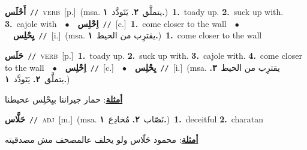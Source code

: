 \documentclass[10pt,a4paper,twoside]{article} %
\begin{document}
\begin{multicols}{2}
{\setlength\topsep{0pt}\textbf{\foreignlanguage{arabic}{أَحْلَس}}\ {\color{gray}\texttt{//}\color{black}}\ \textsc{verb}\ [p.]\ \color{gray}(msa. \foreignlanguage{arabic}{يتملَّق}~\foreignlanguage{arabic}{\textbf{٢.}}  \foreignlanguage{arabic}{يَتَودَّد}~\foreignlanguage{arabic}{\textbf{١.}})\color{black}\ \textbf{1.}~toady up.  \textbf{2.}~suck up with.  \textbf{3.}~cajole with\ \ $\bullet$\ \ \setlength\topsep{0pt}\textbf{\foreignlanguage{arabic}{اِحْلِس}}\ {\color{gray}\texttt{//}\color{black}}\ [c.]\ \textbf{1.}~come closer to the wall\ \ $\bullet$\ \ \setlength\topsep{0pt}\textbf{\foreignlanguage{arabic}{يِحْلِس}}\ {\color{gray}\texttt{//}\color{black}}\ [i.]\ \color{gray}(msa. \foreignlanguage{arabic}{يقترِب من الحيط}~\foreignlanguage{arabic}{\textbf{١.}})\color{black}\ \textbf{1.}~come closer to the wall\ } \vspace{2mm}

{\setlength\topsep{0pt}\textbf{\foreignlanguage{arabic}{حَلَس}}\ {\color{gray}\texttt{//}\color{black}}\ \textsc{verb}\ [p.]\ \textbf{1.}~toady up.  \textbf{2.}~suck up with.  \textbf{3.}~cajole with.  \textbf{4.}~come closer to the wall\ \ $\bullet$\ \ \setlength\topsep{0pt}\textbf{\foreignlanguage{arabic}{اِحْلِس}}\ {\color{gray}\texttt{//}\color{black}}\ [c.]\ \ $\bullet$\ \ \setlength\topsep{0pt}\textbf{\foreignlanguage{arabic}{يِحْلِس}}\ {\color{gray}\texttt{//}\color{black}}\ [i.]\ \color{gray}(msa. \foreignlanguage{arabic}{يقترِب من الحيط}~\foreignlanguage{arabic}{\textbf{٣.}}  \foreignlanguage{arabic}{يتملَّق}~\foreignlanguage{arabic}{\textbf{٢.}}  \foreignlanguage{arabic}{يَتَودَّد}~\foreignlanguage{arabic}{\textbf{١.}})\color{black}\  \begin{flushright}\color{gray}\foreignlanguage{arabic}{\textbf{\underline{\foreignlanguage{arabic}{أمثلة}}}: حمار جيراننا بيِحْلِس عحيطنا}\end{flushright}\color{black}} \vspace{2mm}

{\setlength\topsep{0pt}\textbf{\foreignlanguage{arabic}{حَلَّاس}}\ {\color{gray}\texttt{//}\color{black}}\ \textsc{adj}\ [m.]\ \color{gray}(msa. \foreignlanguage{arabic}{نَصّاب}~\foreignlanguage{arabic}{\textbf{٢.}}  \foreignlanguage{arabic}{مُخادِع}~\foreignlanguage{arabic}{\textbf{١.}})\color{black}\ \textbf{1.}~deceitful  \textbf{2.}~charatan\  \begin{flushright}\color{gray}\foreignlanguage{arabic}{\textbf{\underline{\foreignlanguage{arabic}{أمثلة}}}: محمود حَلّاس ولو يحلف عالمصحف مش مصدقيته}\end{flushright}\color{black}} \vspace{2mm}


\end{multicols}
\end{document}
